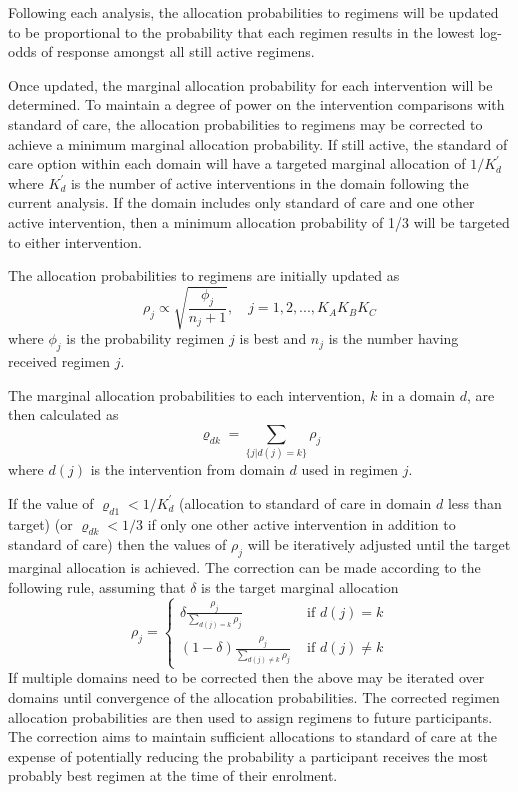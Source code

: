 \documentclass[
  11pt,
]{article}
\begin{document}
Following each analysis, the allocation probabilities to regimens will be updated to be proportional to the probability that each regimen results in the lowest log-odds of response amongst all still active regimens.

Once updated, the marginal allocation probability for each intervention will be determined.
To maintain a degree of power on the intervention comparisons with standard of care, the allocation probabilities to regimens may be corrected to achieve a minimum marginal allocation probability.
If still active, the standard of care option within each domain will have a targeted marginal allocation of \(1/K_d^\prime\) where \(K_d^\prime\) is the number of active interventions in the domain following the current analysis.
If the domain includes only standard of care and one other active intervention, then a minimum allocation probability of 1/3 will be targeted to either intervention.

The allocation probabilities to regimens are initially updated as
\[
\rho_j \propto \sqrt{\frac{\phi_j}{n_{j}+1}},\quad j=1,2,...,K_AK_BK_C
\]
where \(\phi_j\) is the probability regimen \(j\) is best and \(n_{j}\) is the number having received regimen \(j\).

The marginal allocation probabilities to each intervention, \(k\) in a domain \(d\), are then calculated as
\[
\varrho_{dk} = \sum_{\{j|d(j)=k\}} \rho_j
\]
where \(d(j)\) is the intervention from domain \(d\) used in regimen \(j\).

If the value of \(\varrho_{d1} < 1/K_d^\prime\) (allocation to standard of care in domain \(d\) less than target) (or \(\varrho_{dk} < 1/3\) if only one other active intervention in addition to standard of care) then the values of \(\rho_j\) will be iteratively adjusted until the target marginal allocation is achieved.
The correction can be made according to the following rule, assuming that \(\delta\) is the target marginal allocation
\[
\rho_j = \begin{cases}
\delta \frac{\rho_j}{\sum_{d(j)=k} \rho_j} & \text{ if } d(j) = k \\
(1 - \delta) \frac{\rho_j}{\sum_{d(j)\ne k} \rho_j} & \text{ if } d(j) \ne k
\end{cases}
\]
If multiple domains need to be corrected then the above may be iterated over domains until convergence of the allocation probabilities.
The corrected regimen allocation probabilities are then used to assign regimens to future participants.
The correction aims to maintain sufficient allocations to standard of care at the expense of potentially reducing the probability a participant receives the most probably best regimen at the time of their enrolment.
\end{document}
